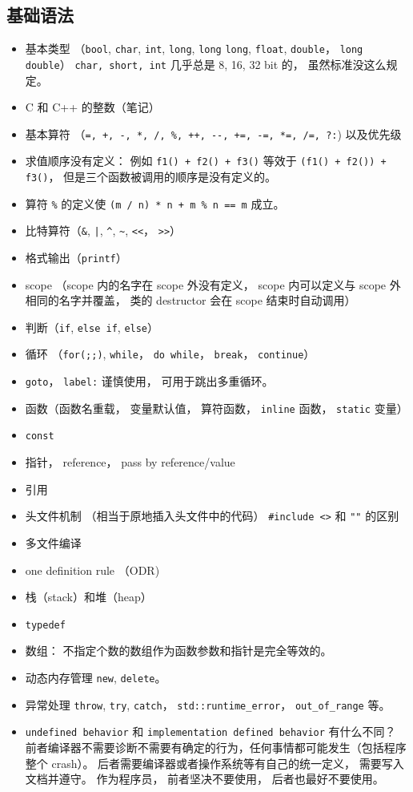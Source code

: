 \subsection{基础语法}
\begin{itemize}
\item 基本类型 （\verb|bool|, \verb|char|, \verb|int|, \verb|long|, \verb|long| \verb|long|, \verb|float|, \verb|double|， \verb|long double|） \verb|char, short, int| 几乎总是 8, 16, 32 bit 的， 虽然标准没这么规定。
\item C 和 C++ 的整数（笔记）
\item 基本算符 （\verb|=, +, -, *, /, %, ++, --, +=, -=, *=, /=, ?:|) 以及优先级
\item 求值顺序没有定义： 例如 \verb|f1() + f2() + f3()| 等效于 \verb|(f1() + f2()) + f3()|， 但是三个函数被调用的顺序是没有定义的。
\item 算符 \verb|%| 的定义使 \verb|(m / n) * n + m % n == m| 成立。
\item 比特算符（\verb|&|, \verb+|+, \verb|^|, \verb|~|, \verb|<<|， \verb|>>|）
\item 格式输出（\verb|printf|）
\item scope （scope 内的名字在 scope 外没有定义， scope 内可以定义与 scope 外相同的名字并覆盖， 类的 destructor 会在 scope 结束时自动调用）
\item 判断（\verb|if|, \verb|else if|, \verb|else|）
\item 循环 （\verb|for(;;)|, \verb|while|， \verb|do while|， \verb|break|， \verb|continue|）
\item \verb|goto|， \verb|label:| 谨慎使用， 可用于跳出多重循环。
\item 函数（函数名重载， 变量默认值， 算符函数， \verb|inline| 函数， \verb|static| 变量）
\item \verb|const|
\item 指针， reference， pass by reference/value
\item 引用
\item 头文件机制 （相当于原地插入头文件中的代码） \verb|#include <>| 和 \verb|""| 的区别
\item 多文件编译
\item one definition rule （ODR)
\item 栈（stack）和堆（heap）
\item \verb|typedef|
\item 数组： 不指定个数的数组作为函数参数和指针是完全等效的。
\item 动态内存管理 \verb|new|, \verb|delete|。
\item 异常处理 \verb|throw|, \verb|try|, \verb|catch|， \verb|std::runtime_error|， \verb|out_of_range| 等。
\item \verb|undefined behavior| 和 \verb|implementation defined behavior| 有什么不同？ 前者编译器不需要诊断不需要有确定的行为，任何事情都可能发生（包括程序整个 crash）。 后者需要编译器或者操作系统等有自己的统一定义， 需要写入文档并遵守。 作为程序员， 前者坚决不要使用， 后者也最好不要使用。
\end{itemize}

